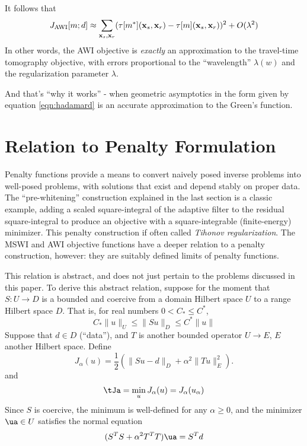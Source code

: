 It follows that
\begin{equation}
  \label{eqn:awitt}
J_{\rm AWI}[m;d] \approx \sum_{{\bf x}_s,{\bf x}_r} (\tau[m^*]({\bf
  x}_s,{\bf x}_r)-\tau[m]({\bf x}_s,{\bf x}_r))^2 + O(\lambda^2)
\end{equation}
In other words, the AWI objective is {\em exactly} an approximation to
the travel-time tomography objective, with errors proportional to the
``wavelength'' $\lambda(w)$ and the regularization parameter
$\lambda$.

And that's ``why it works'' - when geometric asymptotics in the form
given by equation \ref{eqn:hadamard} is an accurate approximation to the Green's function.

\section{Relation to Penalty Formulation}
Penalty functions provide a means to convert naively posed
inverse problems into well-posed problems, with solutions that exist
and depend stably on proper data. The ``pre-whitening'' construction
explained in the last section is a classic example, adding a scaled
square-integral of the adaptive filter to the residual square-integral to
produce an objective with a square-integrable (finite-energy)
minimizer. This penalty construction if often called {\em Tihonov
  regularization}. The MSWI and AWI objective functions have a deeper
relation to a penalty construction, however: they are
suitably defined limits of penalty functions.

This relation is abstract, and does not just pertain to the problems
discussed in this paper. To derive this abstract relation, suppose for
the moment that $S:U \rightarrow D$ is a bounded and coercive from a
domain Hilbert space $U$ to a range Hilbert space $D$. That is, for
real numbers $0 < C_* \le C^*$,
\[
  C_*\|u\|_U \le \|Su\|_D \le C^*\|u\|
\]
Suppose that $d \in D$ (``data''), and $T$ is another bounded operator $U \rightarrow E$, $E$
another Hilbert space. Define
\begin{equation}
  \label{eqn:eq1}
  J_{\alpha}(u) = \frac{1}{2}(\|Su-d\|_D + \alpha^2\|Tu\|_E^2).
\end{equation}
and
\begin{equation}
  \label{eqn:eq0}
  \tJa= \min_u J_{\alpha}(u) = J_{\alpha}(u_{\alpha})
\end{equation}
Since $S$ is coercive, the minimum is well-defined for any
$\alpha \ge 0$, and the minimizer $\ua \in U$ satisfies the normal
equation
\begin{equation}
  \label{eqn:eq0n}
  (S^TS + \alpha^2 T^TT) \ua = S^Td
\end{equation}

